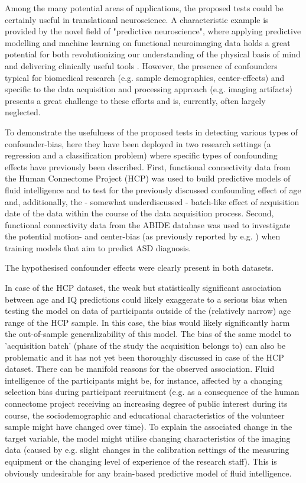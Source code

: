 \documentclass{article}
\begin{document}
Among the many potential areas of applications, the proposed tests could be certainly useful in translational neuroscience. A characteristic example is provided by the novel field of "predictive neuroscience", where applying predictive modelling and machine learning on functional neuroimaging data holds a great potential for both revolutionizing our understanding of the physical basis of mind and delivering clinically useful tools \citep{woo2017building, wager2013fmri, spisak2020pain}. However, the presence of confounders typical for biomedical research (e.g. sample demographics, center-effects) and specific to the data acquisition and processing approach (e.g. imaging artifacts) presents a great challenge to these efforts and is, currently, often largely neglected.

To demonstrate the usefulness of the proposed tests in detecting various types of confounder-bias, here they have been deployed in two research settings (a regression and a classification problem) where specific types of confounding effects have previously been described. 
First, functional connectivity data from the Human Connectome Project (HCP) \citep{van2013wu} was used to build predictive models of fluid intelligence and to test for the previously discussed confounding effect of age \citep{lohmann2021predicting, dubois2018distributed} and,  additionally, the - somewhat underdiscussed - batch-like effect of acquisition date of the data within the course of the data acquisition process.
Second, functional connectivity data from the ABIDE \citep{di2014autism} database was used to investigate the potential motion- and center-bias (as previously reported by e.g. \cite{spisak2014voxel, spisak2019optimal, gotts2013perils}) when training models that aim to predict ASD diagnosis.

The hypothesised confounder effects were clearly present in both datasets.

In case of the HCP dataset, the weak but statistically significant association between age and IQ predictions could likely exaggerate to a serious bias when testing the model on data of participants outside of the (relatively narrow)
age range of the HCP sample. In this case, the bias would likely significantly harm the out-of-sample generalizability of this model. The bias of the same model to 'acquisition batch' (phase of the study the acquisition belongs to) can also be problematic and it has not yet been thoroughly discussed in case of the HCP dataset. There can be manifold reasons for the observed association. Fluid intelligence of the participants might be, for instance, affected by a changing selection bias during participant recruitment (e.g. as a consequence of the human connectome project receiving an increasing degree of public interest during its course, the sociodemographic and educational characteristics of the volunteer sample might have changed over time). To explain the associated change in the target variable, the model might utilise changing characteristics of the imaging data (caused by e.g. slight changes in the calibration settings of the measuring equipment or the changing level of experience of the research staff). This is obviously undesirable for any brain-based predictive model of fluid intelligence.
\end{document}
